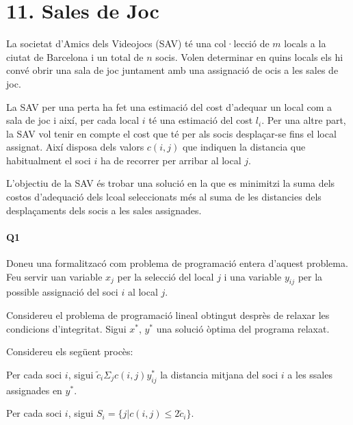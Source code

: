 \section*{11. Sales de Joc}


La societat d'Amics dels Videojocs (SAV) té una col·lecció de $m$  locals a la ciutat de Barcelona i un total de $n$  socis. Volen determinar en quins locals els hi convé obrir una sala de joc juntament amb una assignació de ocis a les sales de joc.

La SAV per una perta ha fet una estimació del cost d'adequar un local com a sala de joc i així, per cada local $i$ té una estimació del cost $l_i$. Per una altre part, la SAV vol tenir en compte el cost que té per als socis desplaçar-se fins el local assignat. Així disposa dels valors $c(i,j)$ que indiquen la distancia que habitualment el soci $i$ ha de recorrer per arribar al local $j$.

L'objectiu de la SAV és trobar una solució en la que es minimitzi la suma dels costos d'adequació dels lcoal seleccionats més al suma de les distancies dels desplaçaments dels socis a les sales assignades.

\paragraph{Q1}
Doneu una formalitzacó com problema de programació entera d'aquest problema. Feu servir uan variable $x_j$ per la selecció del local $j$ i una variable $y_{ij}$ per la possible assignació del soci $i$ al local $j$.

Considereu el problema de programació lineal obtingut desprès de relaxar les condicions d'integritat. Sigui $x^*$, $y^*$ una solució òptima del programa relaxat.

Considereu els següent procès:
\begin{enumerate}[label=(\alph*)]{
\item Per cada soci $i$, sigui $\tilde{c}_i \Sigma_j c(i,j)y^*_{ij} $ la distancia mitjana del soci $i$ a les ssales assignades en $y^*$.
\item Per cada soci $i$, sigui $S_i = \{j | c(i,j) \leq 2\tilde{c}_i\}$.

}
\end{enumerate}








